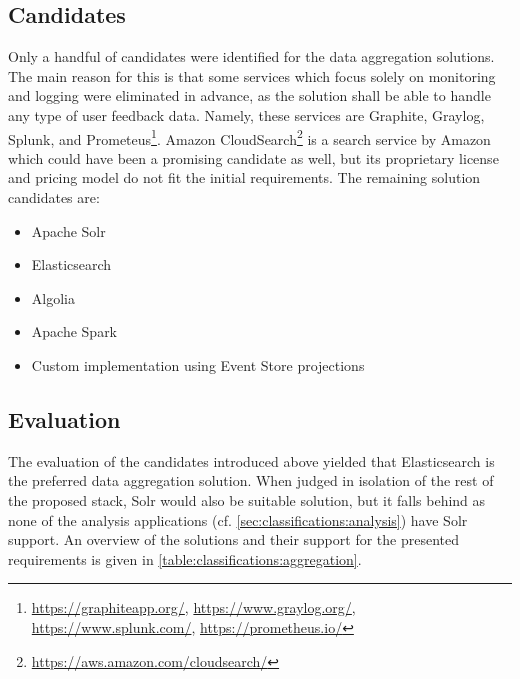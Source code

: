 \subsection{Candidates}

Only a handful of candidates were identified for the data aggregation solutions.
The main reason for this is that some services which focus solely on monitoring and logging were eliminated in advance, as the solution shall be able to handle any type of user feedback data.
Namely, these services are Graphite, Graylog, Splunk, and Prometeus\footnote{\url{https://graphiteapp.org/}, \url{https://www.graylog.org/}, \url{https://www.splunk.com/}, \url{https://prometheus.io/}}.
Amazon CloudSearch\footnote{\url{https://aws.amazon.com/cloudsearch/}} is a search service by Amazon which could have been a promising candidate as well, but its proprietary license and pricing model do not fit the initial requirements.
The remaining solution candidates are:

\begin{itemize}[noitemsep]
\item Apache Solr
\item Elasticsearch
\item Algolia
\item Apache Spark
\item Custom implementation using Event Store projections
\end{itemize}


\subsection{Evaluation}

The evaluation of the candidates introduced above yielded that Elasticsearch is the preferred data aggregation solution.
When judged in isolation of the rest of the proposed stack, Solr would also be suitable solution, but it falls behind as none of the analysis applications (cf. \cref{sec:classifications:analysis}) have Solr support.
An overview of the solutions and their support for the presented requirements is given in \cref{table:classifications:aggregation}.


